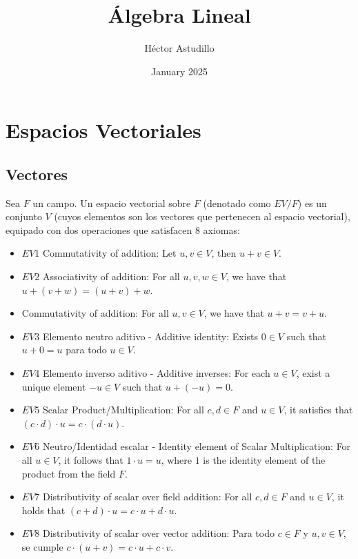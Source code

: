 \documentclass{article}
\title{Álgebra Lineal}
\author{Héctor Astudillo}
\date{January 2025}
\begin{document}
\maketitle

\section{Espacios Vectoriales}
\subsection*{Vectores}
Sea \( F \) un campo. Un espacio vectorial sobre \( F \) (denotado como \( EV/F \)) es un conjunto \( V \) (cuyos elementos son los vectores que pertenecen al espacio vectorial), equipado con dos operaciones que satisfacen 8 axiomas:

\begin{itemize}
    \item \(EV1\) Commutativity of addition: 
    Let \( u, v \in V \), then \( u + v \in V \).
    \item \(EV2\) Associativity of addition:
    For all \( u, v, w \in V \), we have that \( u + (v + w) = (u + v) + w \).
    \item Commutativity of addition: 
    For all \( u, v \in V \), we have that \( u + v = v + u \).
    \item \(EV3\) Elemento neutro aditivo - Additive identity: 
    Exists \( 0 \in V \) such that \( u + 0 = u \) para todo \( u \in V \).
    \item \(EV4\) Elemento inverso aditivo - Additive inverses:
    For each \( u \in V \), exist a unique element \( -u \in V \) such that \( u + (-u) = 0 \).
    \item \(EV5\) Scalar Product/Multiplication: 
    For all \( c, d \in F \) and \( u \in V \), it satisfies that \( (c \cdot d) \cdot u = c \cdot (d \cdot u) \).
    \item \(EV6\) Neutro/Identidad escalar - Identity element of Scalar Multiplication: 
    For all \( u \in V \), it follows that \( 1 \cdot u = u \), where \( 1 \) is the identity element of the product from the field \( F \).
    \item \(EV7\) Distributivity of scalar over field addition: 
    For all \( c, d \in F \) and \( u \in V \), it holds that \( (c + d) \cdot u = c \cdot u + d \cdot u \).
    \item \(EV8\) Distributivity of scalar over vector addition: 
    Para todo \( c \in F \) y \( u, v \in V \), se cumple \( c \cdot (u + v) = c \cdot u + c \cdot v \).
\end{itemize}
\end{document}
